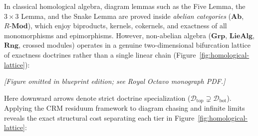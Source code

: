 In classical homological algebra, diagram lemmas such as the Five Lemma, the $3 \times 3$ Lemma, and the Snake Lemma are proved inside \emph{abelian categories} ($\mathbf{Ab}$, $R\text{-}\mathbf{Mod}$), which enjoy biproducts, kernels, cokernels, and exactness of all monomorphisms and epimorphisms. However, non-abelian algebra ($\mathbf{Grp}$, $\mathbf{LieAlg}$, $\mathbf{Rng}$, crossed modules) operates in a genuine two-dimensional bifurcation lattice of exactness doctrines rather than a single linear chain (Figure~\ref{fig:homological-lattice}):

\begin{center}\emph{[Figure omitted in blueprint edition; see Royal Octavo monograph PDF.]}\label{fig:homological-lattice}\end{center}

Here downward arrows denote strict doctrine specialization ($\mathcal{D}_{\mathrm{top}} \supsetneq \mathcal{D}_{\mathrm{bot}}$). Applying the $\mathrm{CRM}$ residuum framework to diagram chasing and infinite limits reveals the exact structural cost separating each tier in Figure~\ref{fig:homological-lattice}:

